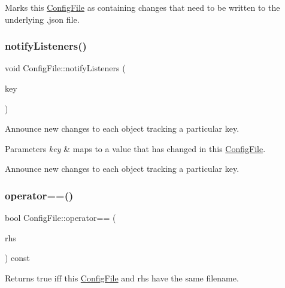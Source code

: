 Marks this \mbox{\hyperlink{classConfigFile}{Config\+File}} as containing changes that need to be written to the underlying .json file. \mbox{\label{classConfigFile_aafbaeb574d209485c120a952d21588c6}} 
\subsubsection{\texorpdfstring{notify\+Listeners()}{notifyListeners()}}
{\footnotesize\ttfamily void Config\+File\+::notify\+Listeners (\begin{DoxyParamCaption}\item[{String}]{key }\end{DoxyParamCaption})}

Announce new changes to each object tracking a particular key.


\begin{DoxyParams}{Parameters}
{\em key} & maps to a value that has changed in this \mbox{\hyperlink{classConfigFile}{Config\+File}}.\\
\hline
\end{DoxyParams}
Announce new changes to each object tracking a particular key. \mbox{\label{classConfigFile_a1c903db747150a045d8b32fc3e8ee122}} 
\subsubsection{\texorpdfstring{operator==()}{operator==()}}
{\footnotesize\ttfamily bool Config\+File\+::operator== (\begin{DoxyParamCaption}\item[{const \mbox{\hyperlink{classConfigFile}{Config\+File}} \&}]{rhs }\end{DoxyParamCaption}) const}

\begin{DoxyReturn}{Returns}
true iff this \mbox{\hyperlink{classConfigFile}{Config\+File}} and rhs have the same filename. 
\end{DoxyReturn}
\mbox{\label{classConfigFile_a2faff4383c2921ee7c67aef7c55f0540}} 
